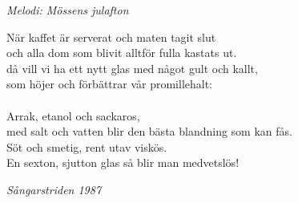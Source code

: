 {\footnotesize\textit{Melodi: Mössens julafton}}\par
\vspace{10pt}
När kaffet är serverat och maten tagit slut\\
och alla dom som blivit alltför fulla kastats ut.\\
då vill vi ha ett nytt glas med något gult och kallt,\\
som höjer och förbättrar vår promillehalt:\\
\\
Arrak, etanol och sackaros,\\
med salt och vatten blir den bästa blandning som kan fås.\\
Söt och smetig, rent utav viskös.\\
En sexton, sjutton glas så blir man medvetslös!
\par
\vspace{10pt}
{\footnotesize\textit{Sångarstriden 1987}}
